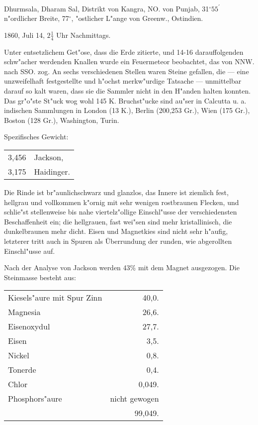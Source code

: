 \documentclass[a4paper, 11pt, oneside]{article}
\begin{document}
\paragraph{}
Dhurmsala, Dharam Sal, Distrikt von Kangra, NO. von Punjab, 31$^\circ 55^\prime$ n"ordlicher Breite, 77$^\circ$, "ostlicher L"ange von Greenw., Ostindien.

1860, Juli 14, $\mathfrak{2\frac{1}{4}}$ Uhr Nachmittags.

Unter entsetzlichem Get"ose, dass die Erde zitierte, und 14-16 darauffolgenden schw"acher werdenden Knallen wurde ein Feuermeteor beobachtet, das von NNW. nach SSO. zog. An sechs verschiedenen Stellen waren Steine gefallen, die --- eine unzweifelhaft festgestellte und h"ochst merkw"urdige Tatsache --- unmittelbar darauf so kalt waren, dass sie die Sammler nicht in den H"anden halten konnten. Das gr"o"ste St"uck wog wohl 145 K. Bruchst"ucke sind au"ser in Calcutta u. a. indischen Sammlungen in London (13 K.), Berlin (200,253 Gr.), Wien (175 Gr.), Boston (128 Gr.), Washington, Turin.

Spezifisches Gewicht:  
\begin{table}[!ht]
    \centering\swabfamily\Large
    \begin{tabular}{l l}
        3,456 & Jackson,\\
        3,175 & Haidinger.
    \end{tabular}
\end{table}

Die Rinde ist br"aunlichschwarz und glanzlos, das Innere ist ziemlich fest, hellgrau und vollkommen k"ornig mit sehr wenigen rostbraunen Flecken, und schlie"st stellenweise bis nahe viertelz"ollige Einschl"usse der verschiedensten Beschaffenheit ein; die hellgrauen, fast wei"sen sind mehr kristallinisch, die dunkelbraunen mehr dicht. Eisen und Magnetkies sind nicht sehr h"aufig, letzterer tritt auch in Spuren als Überrundung der runden, wie abgerollten Einschl"usse auf.

Nach der Analyse von Jackson werden 43\% mit dem Magnet ausgezogen. Die Steinmasse besteht aus:
\begin{table}[H]
    \centering\swabfamily\Large
    \begin{tabular}{l r}
        Kiesels"aure mit Spur Zinn  & 40,0. \\
        Magnesia & 26,6. \\
        Eisenoxydul & 27,7. \\
        Eisen & 3,5. \\
        Nickel & 0,8. \\
        Tonerde & 0,4. \\
        Chlor & 0,049. \\
        Phosphors"aure & nicht gewogen \\
         & 99,049. \\
    \end{tabular}
\end{table}
\end{document}
